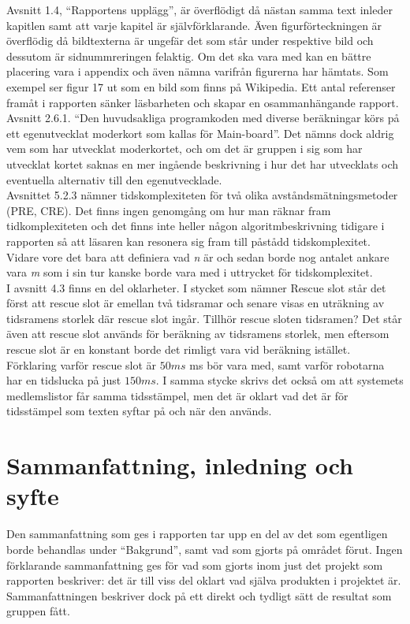\documentclass[a4paper,11pt]{article}
\begin{document}
Avsnitt 1.4, “Rapportens upplägg”, är överflödigt då nästan samma text inleder kapitlen samt att varje kapitel är självförklarande. Även figurförteckningen är överflödig då bildtexterna är ungefär det som står under respektive bild och dessutom är sidnummreringen felaktig. Om det ska vara med kan en bättre placering vara i appendix och även nämna varifrån figurerna har hämtats. Som exempel ser figur 17 ut som en bild som finns på Wikipedia. Ett antal referenser framåt i rapporten sänker läsbarheten och skapar en osammanhängande rapport.\\

Avsnitt 2.6.1. “Den huvudsakliga programkoden med diverse beräkningar körs på ett egenutvecklat moderkort som kallas för Main-board”. Det nämns dock aldrig vem som har utvecklat moderkortet, och om det är gruppen i sig som har utvecklat kortet saknas en mer ingående beskrivning i hur det har utvecklats och eventuella alternativ till den egenutvecklade.\\

Avsnittet 5.2.3 nämner tidskomplexiteten för två olika avståndsmätningsmetoder (PRE, CRE). Det finns ingen genomgång om hur man räknar fram tidkomplexiteten och det finns inte heller någon algoritmbeskrivning tidigare i rapporten så att läsaren kan resonera sig fram till påstådd tidskomplexitet. Vidare vore det bara att definiera vad \emph{n} är och sedan borde nog antalet ankare vara \emph{m} som i sin tur kanske borde vara med i uttrycket för tidskomplexitet. \\

I avsnitt 4.3 finns en del oklarheter. I stycket som nämner Rescue slot står det först att rescue slot är emellan två tidsramar och senare visas en uträkning av tidsramens storlek där rescue slot ingår. Tillhör rescue sloten tidsramen? Det står även att rescue slot används för beräkning av tidsramens storlek, men eftersom rescue slot är en konstant borde det rimligt vara vid beräkning istället. Förklaring varför rescue slot är $50 ms$ ms bör vara med, samt varför robotarna har en tidslucka på just $150 ms$. I samma stycke skrivs det också om att systemets medlemslistor får samma tidsstämpel, men det är oklart vad det är för tidsstämpel som texten syftar på och när den används.

\section{Sammanfattning, inledning och syfte}
Den sammanfattning som ges i rapporten tar upp en del av det som egentligen borde behandlas under “Bakgrund”, samt vad som gjorts på området förut. Ingen förklarande sammanfattning ges för vad som gjorts inom just det projekt som rapporten beskriver: det är till viss del oklart vad själva produkten i projektet är. Sammanfattningen beskriver dock på ett direkt och tydligt sätt de resultat som gruppen fått.
\end{document}
